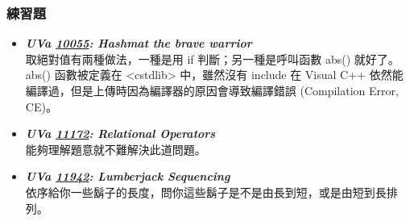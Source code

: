 \subsubsection*{練習題}
\begin{itemize}[label={\Checkmark}]
\item \textbf{\textit{UVa \href{http://uva.onlinejudge.org/external/100/10055.html}{10055}: Hashmat the brave warrior}}\\
取絕對值有兩種做法，一種是用 if 判斷；另一種是呼叫函數 abs() 就好了。abs() 函數被定義在 <cstdlib> 中，雖然沒有 include 在 Visual C++ 依然能編譯過，但是上傳時因為編譯器的原因會導致編譯錯誤 (Compilation Error, CE)。
\item \textbf{\textit{UVa \href{http://uva.onlinejudge.org/external/111/11172.html}{11172}: Relational Operators}}\\
能夠理解題意就不難解決此道問題。
\item \textbf{\textit{UVa \href{http://uva.onlinejudge.org/external/119/11942.html}{11942}: Lumberjack Sequencing}}\\
依序給你一些鬍子的長度，問你這些鬍子是不是由長到短，或是由短到長排列。
\end{itemize}